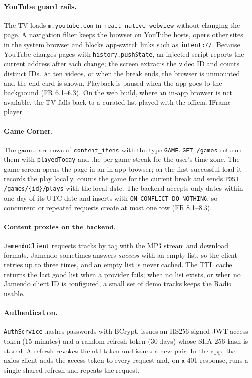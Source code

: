 \paragraph{YouTube guard rails.}
The TV loads \texttt{m.youtube.com} in \texttt{react-native-webview} without
changing the page. A navigation filter keeps the browser on YouTube hosts,
opens other sites in the system browser and blocks app-switch links such as
\texttt{intent://}. Because YouTube changes pages with
\texttt{history.pushState}, an injected script reports the current address
after each change; the screen extracts the video ID and counts distinct IDs.
At ten videos, or when the break ends, the browser is unmounted and the end
card is shown. Playback is paused when the app goes to the background
(FR 6.1--6.3). On the web build, where an in-app browser is not available, the
TV falls back to a curated list played with the official IFrame player.

\paragraph{Game Corner.}
The games are rows of \texttt{content\_items} with the type \texttt{GAME}.
\texttt{GET /games} returns them with \texttt{playedToday} and the per-game
streak for the user's time zone. The game screen opens the page in an in-app
browser; on the first successful load it records the play locally, counts the
game for the current break and sends \texttt{POST /games/\{id\}/plays} with the
local date. The backend accepts only dates within one day of its UTC date and
inserts with \texttt{ON CONFLICT DO NOTHING}, so concurrent or repeated
requests create at most one row (FR 8.1--8.3).

\paragraph{Content proxies on the backend.}
\texttt{JamendoClient} requests tracks by tag with the MP3 stream and download
formats. Jamendo sometimes answers \textit{success} with an empty list, so the
client retries up to three times, and an empty list is never cached. The TTL
cache returns the last good list when a provider fails; when no list exists,
or when no Jamendo client ID is configured, a small set of demo tracks keeps
the Radio usable.

\paragraph{Authentication.}
\texttt{AuthService} hashes passwords with BCrypt, issues an HS256-signed JWT
access token (15 minutes) and a random refresh token (30 days) whose SHA-256
hash is stored. A refresh revokes the old token and issues a new pair. In the
app, the axios client adds the access token to every request and, on a 401
response, runs a single shared refresh and repeats the request.

